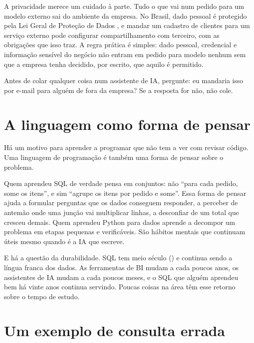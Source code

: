 A privacidade merece um cuidado à parte. Tudo o que vai num pedido para um modelo externo
sai do ambiente da empresa. No Brasil, dado pessoal é protegido pela Lei Geral de Proteção
de Dados \parencite{lgpd2018}, e mandar um cadastro de clientes para um serviço externo
pode configurar compartilhamento com terceiro, com as obrigações que isso traz.
 A regra prática é
simples: dado pessoal, credencial e informação sensível do negócio não entram em pedido
para modelo nenhum sem que a empresa tenha decidido, por escrito, que aquilo é permitido.

\begin{dica}
Antes de colar qualquer coisa num assistente de IA, pergunte: eu mandaria isso por e-mail
para alguém de fora da empresa? Se a resposta for não, não cole.
\end{dica}

\section{A linguagem como forma de pensar}
\label{sec:linguagem-pensar}

Há um motivo para aprender a programar que não tem a ver com revisar código. Uma
linguagem de programação é também uma forma de pensar sobre o problema.

Quem aprendeu SQL de verdade pensa em conjuntos: não \enquote{para cada pedido, some os
itens}, e sim \enquote{agrupe os itens por pedido e some}. Essa forma de pensar ajuda a
formular perguntas que os dados conseguem responder, a perceber de antemão onde uma junção
vai multiplicar linhas, a desconfiar de um total que cresceu demais. Quem aprendeu Python
para dados aprende a decompor um problema em etapas pequenas e verificáveis. São hábitos
mentais que continuam úteis mesmo quando é a IA que escreve.

E há a questão da durabilidade. SQL tem meio século () e
continua sendo a língua franca dos dados. As ferramentas de BI mudam a cada poucos anos, os
assistentes de IA mudam a cada poucos meses, e o SQL que alguém aprendeu bem há vinte anos
continua servindo. Poucas coisas na área têm esse retorno sobre o tempo de estudo.

\section{Um exemplo de consulta errada}
\label{sec:consulta-errada}

